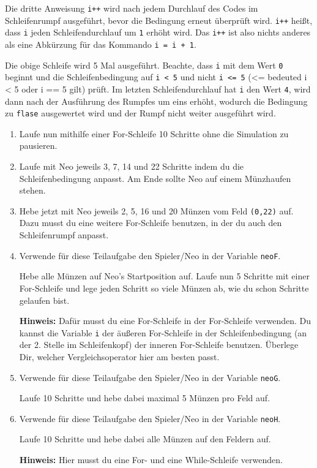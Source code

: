 \begin{Infobox}
	Die dritte Anweisung \lstinline{i++} wird nach jedem Durchlauf des Codes im Schleifenrumpf ausgeführt, bevor die Bedingung erneut überprüft wird.
	\lstinline{i++} heißt, dass \lstinline{i} jeden Schleifendurchlauf um \lstinline{1} erhöht wird.
	Das \lstinline{i++} ist also nichts anderes als eine Abkürzung für das Kommando \lstinline{i = i + 1}.\newline

	Die obige Schleife wird 5 Mal ausgeführt.
	Beachte, dass \lstinline{i} mit dem Wert \lstinline{0} beginnt und die Schleifenbedingung auf \lstinline{i < 5} und nicht \lstinline{i <= 5} (<= bedeuted i < 5 oder i == 5 gilt) prüft.
	Im letzten Schleifendurchlauf hat \lstinline{i} den Wert \lstinline{4}, wird dann nach der Ausführung des Rumpfes um eins erhöht, wodurch die Bedingung zu \lstinline{flase} ausgewertet wird und der Rumpf nicht weiter ausgeführt wird.
\end{Infobox}


\begin{enumerate}\setcounter{enumi}{0}
	\item
		Laufe nun mithilfe einer For-Schleife 10 Schritte ohne die Simulation zu pausieren.

	\item
		Laufe mit Neo jeweils 3, 7, 14 und 22 Schritte indem du die Schleifenbedingung anpasst.
		Am Ende sollte Neo auf einem Münzhaufen stehen.

	\item
		Hebe jetzt mit Neo jeweils 2, 5, 16 und 20 Münzen vom Feld \texttt{(0,22)} auf.
		Dazu musst du eine weitere For-Schleife benutzen, in der du auch den Schleifenrumpf anpasst.

	\item
		Verwende für diese Teilaufgabe den Spieler/Neo in der Variable \lstinline{neoF}.

		Hebe alle Münzen auf Neo's Startposition auf.
		Laufe nun 5 Schritte mit einer For-Schleife und lege jeden Schritt so viele Münzen ab, wie du schon Schritte gelaufen bist.

		\textbf{Hinweis:} Dafür musst du eine For-Schleife in der For-Schleife verwenden.
		Du kannst die Variable \lstinline{i} der äußeren For-Schleife in der Schleifenbedingung (an der 2. Stelle im Schleifenkopf) der inneren For-Schleife benutzen.
		Überlege Dir, welcher Vergleichsoperator hier am besten passt.

	\item
		Verwende für diese Teilaufgabe den Spieler/Neo in der Variable \lstinline{neoG}.

		Laufe 10 Schritte und hebe dabei maximal 5 Münzen pro Feld auf.

	\item
		Verwende für diese Teilaufgabe den Spieler/Neo in der Variable \lstinline{neoH}.

		Laufe 10 Schritte und hebe dabei alle Münzen auf den Feldern auf.

		\textbf{Hinweis:} Hier musst du eine For- und eine While-Schleife verwenden.
\end{enumerate}

